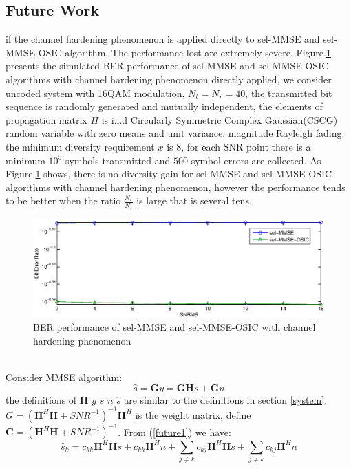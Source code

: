 \documentclass[12pt,a4paper,final]{article}
\begin{document}
\begin{spacing}{2.5}
\section{Future Work}
if the channel hardening phenomenon is applied directly to sel-MMSE and sel-MMSE-OSIC algorithm. The performance lost are extremely severe, Figure.\ref{figure1} presents the simulated BER performance of sel-MMSE and sel-MMSE-OSIC algorithms with channel hardening phenomenon directly applied, we consider uncoded system with 16QAM modulation, $N_{t}=N_{r}=40$, the transmitted bit sequence is randomly generated and  mutually independent, the elements of propagation matrix $H$ is i.i.d Circularly Symmetric Complex Gaussian(CSCG) random variable with zero means and unit variance, magnitude Rayleigh fading. the minimum diversity requirement $x$ is 8, for each SNR point there is a minimum $10^{5}$ symbols transmitted and $500$ symbol errors are collected. As Figure.\ref{figure1} shows, there is no diversity gain for sel-MMSE and sel-MMSE-OSIC algorithms with channel hardening phenomenon, however the performance tends to be better when the ratio $\frac{N_{r}}{N_{t}}$ is large that is several tens.\\
\begin{figure}[hb]
\centering
\includegraphics[scale=0.8]{hardening.eps}
\caption{BER performance of sel-MMSE and sel-MMSE-OSIC with channel hardening phenomenon}
\label{figure1}
\end{figure} \\
Consider MMSE algorithm:
 \begin{equation}
 \hat{s}=\mathbf{G}y=\mathbf{G}\mathbf{H}s+\mathbf{G}n    \label{future1}
 \end{equation}
the definitions of $\mathbf{H}$ $y$ $s$ $n$ $\hat{s}$ are similar to the definitions in section \ref{system}. $G=(\mathbf{H}^{H}\mathbf{H}+SNR^{-1})^{-1}\mathbf{H}^{H}$ is the weight matrix, define $\mathbf{C}=(\mathbf{H}^{H}\mathbf{H}+SNR^{-1})^{-1}$. From (\ref{future1}) we have:
 \begin{equation}
\hat{s}_{k}=c_{kk}\mathbf{H}^{H}\mathbf{H}s+c_{kk}\mathbf{H}^{H}n+\sum_{j\neq k}c_{kj}\mathbf{H}^{H}\mathbf{H}s+\sum_{j\neq k}c_{kj}\mathbf{H}^{H}n \label{future2}

\end{equation}
\end{spacing}
\end{document}
